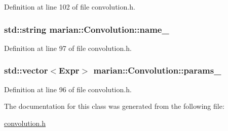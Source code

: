 Definition at line 102 of file convolution.\+h.

\subsubsection[{\texorpdfstring{name\+\_\+}{name_}}]{\setlength{\rightskip}{0pt plus 5cm}std\+::string marian\+::\+Convolution\+::name\+\_\+\hspace{0.3cm}{\ttfamily [private]}}\hypertarget{classmarian_1_1Convolution_adf629c3e64cd0bd05a742543144512d5}{}\label{classmarian_1_1Convolution_adf629c3e64cd0bd05a742543144512d5}


Definition at line 97 of file convolution.\+h.

\subsubsection[{\texorpdfstring{params\+\_\+}{params_}}]{\setlength{\rightskip}{0pt plus 5cm}std\+::vector$<${\bf Expr}$>$ marian\+::\+Convolution\+::params\+\_\+\hspace{0.3cm}{\ttfamily [private]}}\hypertarget{classmarian_1_1Convolution_a6a56e7a677386b591a1622732f53ae9a}{}\label{classmarian_1_1Convolution_a6a56e7a677386b591a1622732f53ae9a}


Definition at line 96 of file convolution.\+h.



The documentation for this class was generated from the following file\+:\begin{DoxyCompactItemize}
\item 
\hyperlink{convolution_8h}{convolution.\+h}\end{DoxyCompactItemize}
